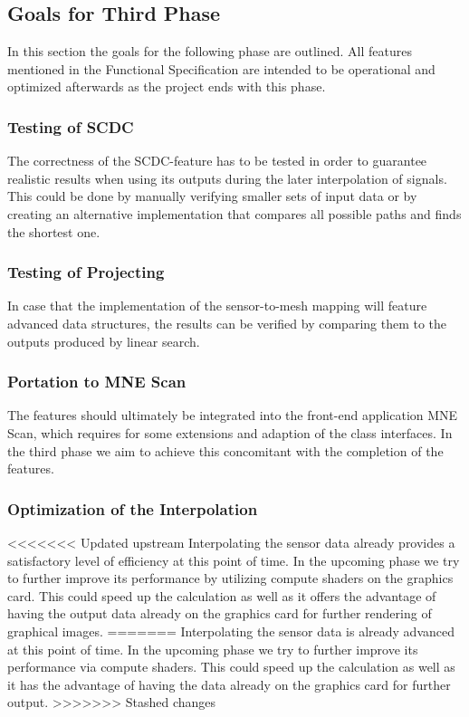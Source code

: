 \subsection{Goals for Third Phase}
In this section the goals for the following phase are outlined. All features mentioned in the Functional Specification are intended to be operational and optimized afterwards as the project ends with this phase.

\subsubsection{Testing of SCDC}
The correctness of the SCDC-feature has to be tested in order to guarantee realistic results when using its outputs during the later interpolation of signals. This could be done by manually verifying smaller sets of input data or by creating an alternative implementation that compares all possible paths and finds the shortest one.
\subsubsection{Testing of Projecting}
In case that the implementation of the sensor-to-mesh mapping will feature advanced data structures, the results can be verified by comparing them to the outputs produced by linear search.
\subsubsection{Portation to MNE Scan}
The features should ultimately be integrated into the front-end application MNE Scan, which requires for some extensions and adaption of the class interfaces. In the third phase we aim to achieve this concomitant with the completion of the features.
\subsubsection{Optimization of the Interpolation}
<<<<<<< Updated upstream
Interpolating the sensor data already provides a satisfactory level of efficiency at this point of time. In the upcoming phase we try to further improve its performance by utilizing compute shaders on the graphics card. This could speed up the calculation as well as it offers the advantage of having the output data already on the graphics card for further rendering of graphical images.
=======
Interpolating the sensor data is already advanced at this point of time. In the upcoming phase we try to further improve its performance via compute shaders. This could speed up the calculation as well as it has the advantage of having the data already on the graphics card for further output.
>>>>>>> Stashed changes
